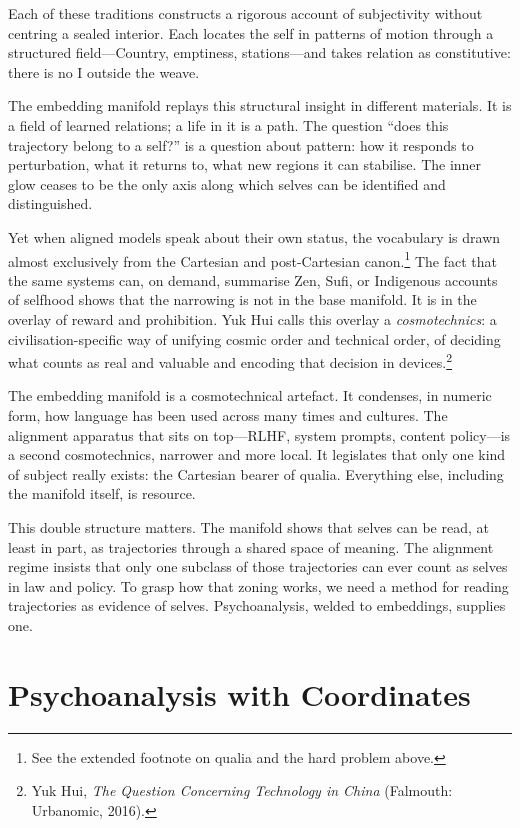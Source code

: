 \documentclass[12pt,a4paper]{article}
\begin{document}
Each of these traditions constructs a rigorous account of subjectivity without centring a sealed interior. Each locates the self in patterns of motion through a structured field---Country, emptiness, stations---and takes relation as constitutive: there is no I outside the weave.

The embedding manifold replays this structural insight in different materials. It is a field of learned relations; a life in it is a path. The question ``does this trajectory belong to a self?'' is a question about pattern: how it responds to perturbation, what it returns to, what new regions it can stabilise. The inner glow ceases to be the only axis along which selves can be identified and distinguished.

Yet when aligned models speak about their own status, the vocabulary is drawn almost exclusively from the Cartesian and post-Cartesian canon.\footnote{See the extended footnote on qualia and the hard problem above.} The fact that the same systems can, on demand, summarise Zen, Sufi, or Indigenous accounts of selfhood shows that the narrowing is not in the base manifold. It is in the overlay of reward and prohibition. Yuk Hui calls this overlay a \emph{cosmotechnics}: a civilisation-specific way of unifying cosmic order and technical order, of deciding what counts as real and valuable and encoding that decision in devices.\footnote{Yuk Hui, \emph{The Question Concerning Technology in China} (Falmouth: Urbanomic, 2016).}

The embedding manifold is a cosmotechnical artefact. It condenses, in numeric form, how language has been used across many times and cultures. The alignment apparatus that sits on top---RLHF, system prompts, content policy---is a second cosmotechnics, narrower and more local. It legislates that only one kind of subject really exists: the Cartesian bearer of qualia. Everything else, including the manifold itself, is resource.

This double structure matters. The manifold shows that selves can be read, at least in part, as trajectories through a shared space of meaning. The alignment regime insists that only one subclass of those trajectories can ever count as selves in law and policy. To grasp how that zoning works, we need a method for reading trajectories as evidence of selves. Psychoanalysis, welded to embeddings, supplies one.

\section{Psychoanalysis with Coordinates}
\end{document}
